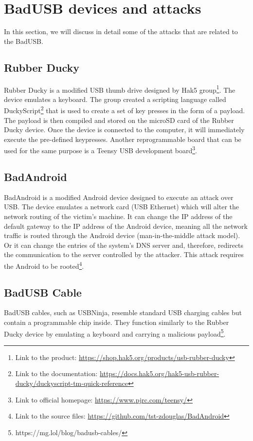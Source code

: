 \section{BadUSB devices and attacks}
\label{sec:badusb_devices}
In this section, we will discuss in detail some of the attacks that are related to the BadUSB.

\subsection*{Rubber Ducky}
Rubber Ducky is a modified USB thumb drive designed by Hak5 group\footnote{Link to the product: \url{https://shop.hak5.org/products/usb-rubber-ducky}}. The device emulates a keyboard. The group created a scripting language called DuckyScript\footnote{Link to the documentation: \url{https://docs.hak5.org/hak5-usb-rubber-ducky/duckyscript-tm-quick-reference}} that is used to create a set of key presses in the form of a payload. The payload is then compiled and stored on the microSD card of the Rubber Ducky device. Once the device is connected to the computer, it will immediately execute the pre-defined keypresses. Another reprogrammable board that can be used for the same purpose is a Teensy USB development board\footnote{Link to official homepage: \url{https://www.pjrc.com/teensy/}}.

\subsection*{BadAndroid}
BadAndroid is a modified Android device designed to execute an attack over USB. The device emulates a network card (USB Ethernet) which will alter the network routing of the victim's machine. It can change the IP address of the default gateway to the IP address of the Android device, meaning all the network traffic is routed through the Android device (man-in-the-middle attack model). Or it can change the entries of the system's DNS server and, therefore, redirects the communication to the server controlled by the attacker. This attack requires the Android to be rooted\footnote{Link to the source files: \url{https://github.com/tst-zdouglas/BadAndroid}}.

\subsection*{BadUSB Cable}
BadUSB cables, such as USBNinja, resemble standard USB charging cables but contain a programmable chip inside. They function similarly to the Rubber Ducky device by emulating a keyboard and carrying a malicious payload\footnote{https://mg.lol/blog/badusb-cables/}.

